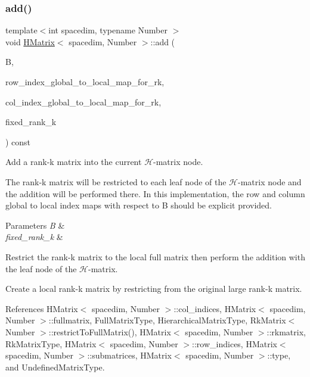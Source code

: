 \mbox{\label{classHMatrix_a1793dff400aeae649f909d7f45db8b8a}} 
\subsubsection{\texorpdfstring{add()}{add()}\hspace{0.1cm}{\footnotesize\ttfamily [5/10]}}
{\footnotesize\ttfamily template$<$int spacedim, typename Number $>$ \\
void \hyperlink{classHMatrix}{H\+Matrix}$<$ spacedim, Number $>$\+::add (\begin{DoxyParamCaption}\item[{const \hyperlink{classRkMatrix}{Rk\+Matrix}$<$ Number $>$ \&}]{B,  }\item[{const std\+::map$<$ types\+::global\+\_\+dof\+\_\+index, size\+\_\+t $>$ \&}]{row\+\_\+index\+\_\+global\+\_\+to\+\_\+local\+\_\+map\+\_\+for\+\_\+rk,  }\item[{const std\+::map$<$ types\+::global\+\_\+dof\+\_\+index, size\+\_\+t $>$ \&}]{col\+\_\+index\+\_\+global\+\_\+to\+\_\+local\+\_\+map\+\_\+for\+\_\+rk,  }\item[{const \hyperlink{classHMatrix_a5ca8dc549783d38371a01ecd621ecb34}{size\+\_\+type}}]{fixed\+\_\+rank\+\_\+k }\end{DoxyParamCaption}) const}

Add a rank-\/k matrix into the current $\mathcal{H}$-\/matrix node.

The rank-\/k matrix will be restricted to each leaf node of the $\mathcal{H}$-\/matrix node and the addition will be performed there. In this implementation, the row and column global to local index maps with respect to {\ttfamily B} should be explicit provided.


\begin{DoxyParams}{Parameters}
{\em B} & \\
\hline
{\em fixed\+\_\+rank\+\_\+k} & \\
\hline
\end{DoxyParams}
Restrict the rank-\/k matrix to the local full matrix then perform the addition with the leaf node of the $\mathcal{H}$-\/matrix.

Create a local rank-\/k matrix by restricting from the original large rank-\/k matrix.

References H\+Matrix$<$ spacedim, Number $>$\+::col\+\_\+indices, H\+Matrix$<$ spacedim, Number $>$\+::fullmatrix, Full\+Matrix\+Type, Hierarchical\+Matrix\+Type, Rk\+Matrix$<$ Number $>$\+::restrict\+To\+Full\+Matrix(), H\+Matrix$<$ spacedim, Number $>$\+::rkmatrix, Rk\+Matrix\+Type, H\+Matrix$<$ spacedim, Number $>$\+::row\+\_\+indices, H\+Matrix$<$ spacedim, Number $>$\+::submatrices, H\+Matrix$<$ spacedim, Number $>$\+::type, and Undefined\+Matrix\+Type.

